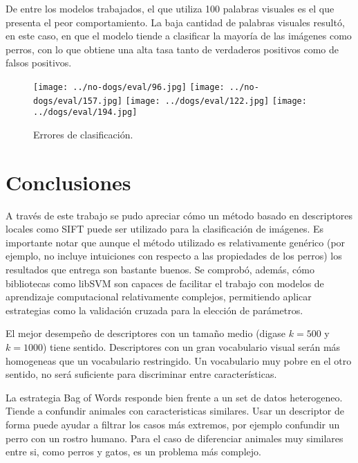 \documentclass[12pt]{article}
\begin{document}
De entre los modelos trabajados, el que utiliza 100 palabras visuales es el que
presenta el peor comportamiento. La baja cantidad de palabras visuales resultó,
en este caso, en que el modelo tiende a clasificar la mayoría de las imágenes
como perros, con lo que obtiene una alta tasa tanto de verdaderos positivos como
de falsos positivos.

\begin{figure}[H]
    \centering
{\texttt{[image: ../no-dogs/eval/96.jpg]}
  \texttt{[image: ../no-dogs/eval/157.jpg]}}
{\texttt{[image: ../dogs/eval/122.jpg]}
  \texttt{[image: ../dogs/eval/194.jpg]}}
    \caption{Errores de clasificación.}
\end{figure}

\section{Conclusiones}

A través de este trabajo se pudo apreciar cómo un método basado en descriptores
locales como SIFT puede ser utilizado para la clasificación de imágenes. Es
importante notar que aunque el método utilizado es relativamente genérico (por
ejemplo, no incluye intuiciones con respecto a las propiedades de los perros)
los resultados que entrega son bastante buenos. Se comprobó, además, cómo
bibliotecas como libSVM son capaces de facilitar el trabajo con modelos de
aprendizaje computacional relativamente complejos, permitiendo aplicar
estrategias como la validación cruzada para la elección de parámetros.

El mejor desempeño de descriptores con un tamaño medio (digase $k=500$ y $k=1000$) tiene sentido.
Descriptores con un gran vocabulario visual serán más homogeneas que un vocabulario restringido.
Un vocabulario muy pobre en el otro sentido, no será suficiente para discriminar entre características.

La estrategia Bag of Words responde bien frente a un set de datos heterogeneo. Tiende a confundir animales con caracteristicas similares.
Usar un descriptor de forma puede ayudar a filtrar los casos más extremos, por ejemplo confundir un perro con un rostro humano.
Para el caso de diferenciar animales muy similares entre si, como perros y gatos, es un problema más complejo.





\end{document}

